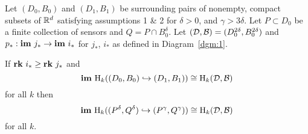 \begin{theorem}\label{thm:tcc}
  Let $(D_0, B_0)$ and $(D_1, B_1)$ be surrounding pairs of nonempty, compact subsets of $\mathbb{R}^d$ satisfying assumptions 1 \& 2 for $\delta > 0$, and $\gamma > 3\delta$.
  Let $P\subset D_0$ be a finite collection of sensors and $Q = P\cap B_0^\delta$.
  Let $({\mathcal{D}}, {\mathcal{B}}) = (D_0^{2\delta}, B_0^{2\delta})$ and $p_* : \mathbf{im}~j_*\to\mathbf{im}~i_*$ for $j_*$, $i_*$ as defined in Diagram~\ref{dgm:1}.

  If $\mathbf{rk}~i_*\geq \mathbf{rk}~j_*$ and
  \[ \mathbf{im}~\mathrm{H}_k((D_0, B_0)\hookrightarrow (D_1, B_1))\cong \mathrm{H}_k({\mathcal{D}}, {\mathcal{B}}) \]
  for all $k$ then
  \[ \mathbf{im}~\mathrm{H}_k((P^\delta, Q^\delta)\hookrightarrow (P^\gamma, Q^\gamma))\cong \mathrm{H}_k({\mathcal{D}}, {\mathcal{B}}) \]
  for all $k$.
\end{theorem}
